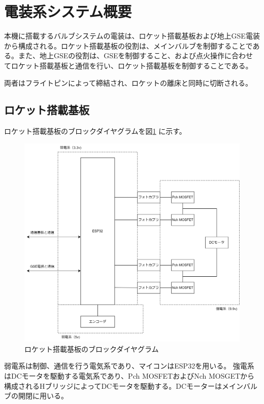 \documentclass[dvipdfmx,a4j]{jsarticle}
\begin{document}
\section{電装系システム概要}

本機に搭載するバルブシステムの電装は、ロケット搭載基板および地上GSE電装から構成される。ロケット搭載基板の役割は、メインバルブを制御することである。また、地上GSEの役割は、GSEを制御すること、および点火操作に合わせてロケット搭載基板と通信を行い、ロケット搭載基板を制御することである。

両者はフライトピンによって締結され、ロケットの離床と同時に切断される。

\subsection{ロケット搭載基板}

ロケット搭載基板のブロックダイヤグラムを図\ref{newGenPropulsionBRDChart} に示す。

\begin{figure}[htbp]
    \centering
    \includegraphics[width = 15cm]{figures/newGenPropulsionBRDChart.drawio.png}
    \caption{ロケット搭載基板のブロックダイヤグラム}
    \label{newGenPropulsionBRDChart}
\end{figure}

弱電系は制御、通信を行う電気系であり、マイコンはESP32を用いる。
強電系はDCモータを駆動する電気系であり、Pch MOSFETおよびNch MOSGETから構成されるHブリッジによってDCモータを駆動する。DCモーターはメインバルブの開閉に用いる。
\end{document}
